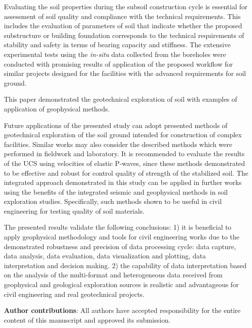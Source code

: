 \documentclass[USenglish,twocolumn]{article}
\begin{document}
Evaluating the soil properties during the subsoil construction cycle is essential for assessment of soil quality and compliance with the technical requirements. This includes the evaluation of parameters of soil that indicate whether the proposed substructure or building foundation corresponds to the technical requirements of stability and safety in terms of bearing capacity and stiffness. The extensive experimental tests using the \emph{in-situ} data collected from the boreholes were conducted with promising results of application of the proposed workflow for similar projects designed for the facilities with the advanced requirements for soil ground. 

This paper demonstrated the geotechnical exploration of soil with examples of application of geophysical methods. 

Future applications of the presented study can adopt presented methods of geotechnical exploration of the soil ground intended for construction of complex facilities. Similar works may also consider the described methods which were performed in fieldwork and laboratory. It is recommended to evaluate the results of the UCS using velocities of elastic P-waves, since these methods demonstrated to be effective and robust for control quality of strength of the stabilized soil. The integrated approach demonstrated in this study can be applied in further works using the benefits of the integrated seismic and geophysical methods in soil exploration studies. Specifically, such methods shown to be useful in civil engineering for testing quality of soil materials.

The presented results validate the following conclusions: 1) it is beneficial to apply geophysical methodology and tools for civil engineering works due to the demonstrated robustness and precision of data processing cycle: data capture, data analysis, data evaluation, data visualization and plotting, data interpretation and decision making. 2) the capability of data interpretation based on the analysis of the multi-format and heterogeneous data received from geophysical and geological exploration sources is realistic and advantageous for civil engineering and real geotechnical projects.

\vspace{10pt}

\noindent
\textbf{Author contributions}: All authors have accepted responsibility for the entire content of this manuscript and approved its submission.

\vspace{10pt}
\end{document}
